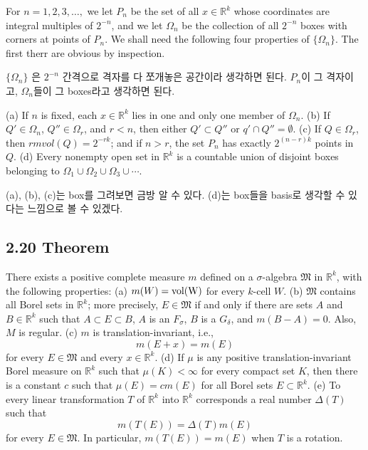 \documentclass[11pt,reqno]{amsart}
\renewcommand{\(}{\left(}
\renewcommand{\)}{\right)}
\renewcommand{\[}{\left[}
\renewcommand{\]}{\right]}
\newcommand{\R}{\mathbb{R}}
\newcommand{\M}{\mathfrak{M}}
\begin{document}
For $n = 1, 2, 3, \dots,$ we let $P_n$ be the set of all $x \in \R^k$ whose coordinates are integral multiples of $2^{-n}$, 
and we let $\Omega_n$ be the collection of all $2^{-n}$ boxes with corners at points of $P_n$. We shall need the following four properties of 
$\{ \Omega_n \}$. The first therr are obvious by inspection.

$\{ \Omega_n \}$ 은 $2^{-n}$ 간격으로 격자를 다 쪼개놓은 공간이라 생각하면 된다. $P_n$이 그 격자이고, $\Omega_n$들이 그 boxes라고 생각하면 된다.

(a) If $n$ is fixed, each $x \in \R^k$ lies in one and only one member of $\Omega_n$.
(b) If $Q' \in \Omega_n$, $Q'' \in \Omega_r$, and $r < n$, then either $Q' \subset Q''$ or $q' \cap Q'' = \emptyset$.
(c) If $Q \in \Omega_r$, then $rm vol(Q) = 2^{-rk}$; and if $n > r$, the set $P_n$ has exactly $2 ^ {(n-r)k}$ points in $Q$.
(d) Every nonempty open set in $\R^k$ is a countable union of disjoint boxes belonging to $\Omega_1 \cup \Omega_2 \cup \Omega_3 \cup \cdots$.

(a), (b), (c)는 box를 그려보면 금방 알 수 있다. (d)는 box들을 basis로 생각할 수 있다는 느낌으로 볼 수 있겠다.

\subsection{2.20 Theorem}

There exists a positive complete measure $m$ defined on a $\sigma$-algebra $\M$ in $\R^k$, with the following properties:
(a) $m(W) = \rm vol(W)$ for every $k$-cell $W$.
(b) $\M$ contains all Borel sets in $\R^k$; more precisely, $E \in \M$ if and only if there are sets $A$ and $B \in \R^k$ such that 
$A \subset E \subset B$, $A$ is an $F_\sigma$, $B$ is a $G_\delta$, and $m (B - A) = 0$. Also, $M$ is regular.
(c) $m$ is translation-invariant, i.e., 
\begin{equation}
  m(E + x) = m(E)
\end{equation}
for every $E \in \M$ and every $x \in \R^k$.
(d) If $\mu$ is any positive translation-invariant Borel measure on $\R^k$ such that $\mu(K) < \infty$ for every compact set $K$, 
then there is a constant $c$ such that $\mu (E) = c m (E)$ for all Borel sets $E \subset \R^k$.
(e) To every linear transformation $T$ of $\R^k$ into $\R^k$ corresponds a real number $\Delta (T)$ such that 
\begin{equation}
  m(T(E)) = \Delta (T) m (E) 
\end{equation}
for every $E \in \M$. In particular, $m(T(E)) = m(E)$ when $T$ is a rotation.
\end{document}
